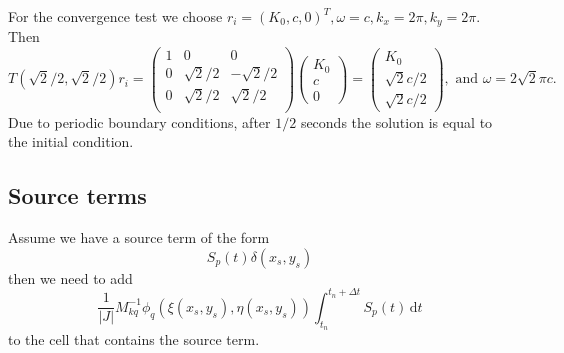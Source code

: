 \documentclass[a4paper]{scrartcl}
\newcommand{\dd}[1]{\,\mathrm{d}#1}
\begin{document}
For the convergence test we choose $r_i = (K_0, c, 0)^T, \omega = c, k_x=2\pi, k_y=2\pi$. Then
\begin{equation}
 T\left(\sqrt{2}/2,\sqrt{2}/2\right)r_i = \begin{pmatrix}
              1 & 0 & 0 \\
              0 & \sqrt{2}/2 & -\sqrt{2}/2 \\
              0 & \sqrt{2}/2 & \sqrt{2}/2 \\
             \end{pmatrix}
\begin{pmatrix}K_0\\ c \\ 0\end{pmatrix} = 
\begin{pmatrix}K_0\\ \sqrt{2}c/2 \\ \sqrt{2}c/2\end{pmatrix}, \text{ and } \omega = 2\sqrt{2}\pi c.
\end{equation}
Due to periodic boundary conditions, after $1/2$ seconds the solution is equal to the initial condition.

\subsection{Source terms}
Assume we have a source term of the form
\begin{equation}
 S_p(t)\delta(x_s,y_s)
\end{equation}
then we need to add
\begin{equation}
 \frac{1}{|J|}M_{kq}^{-1}\phi_q\left(\xi(x_s,y_s),\eta(x_s,y_s) \right)\int_{t_n}^{t_n+\Delta t} S_p(t)\dd{t}
\end{equation}
to the cell that contains the source term.
\end{document}
